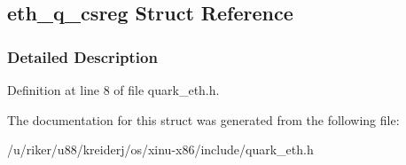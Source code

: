 \hypertarget{structeth__q__csreg}{}\subsection{eth\+\_\+q\+\_\+csreg Struct Reference}
\label{structeth__q__csreg}


\subsubsection{Detailed Description}


Definition at line 8 of file quark\+\_\+eth.\+h.



The documentation for this struct was generated from the following file\+:\begin{DoxyCompactItemize}
\item 
/u/riker/u88/kreiderj/os/xinu-\/x86/include/quark\+\_\+eth.\+h\end{DoxyCompactItemize}
